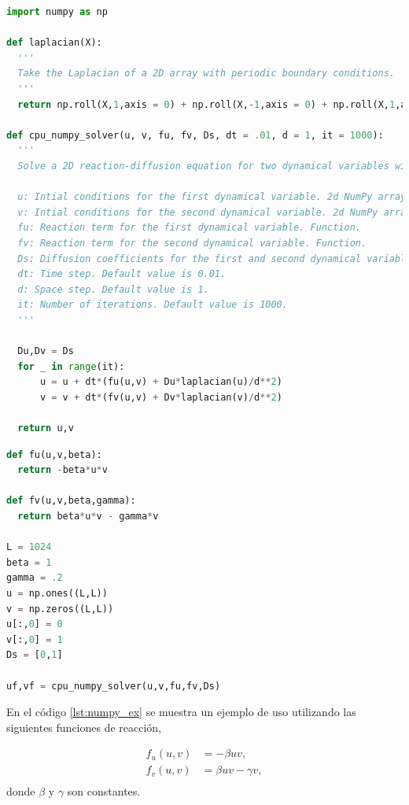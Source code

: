 \begin{lstlisting}[language=Python,caption = Implementación con NumPy.,label = {lst:NumPy}]
import numpy as np

def laplacian(X):
  '''
  Take the Laplacian of a 2D array with periodic boundary conditions.
  '''
  return np.roll(X,1,axis = 0) + np.roll(X,-1,axis = 0) + np.roll(X,1,axis = 1) + np.roll(X,-1,axis = 1) - 4*X

def cpu_numpy_solver(u, v, fu, fv, Ds, dt = .01, d = 1, it = 1000):
  '''
  Solve a 2D reaction-diffusion equation for two dynamical variables with periodic boundary conditions using NumPy.

  u: Intial conditions for the first dynamical variable. 2d NumPy array.
  v: Intial conditions for the second dynamical variable. 2d NumPy array.
  fu: Reaction term for the first dynamical variable. Function.
  fv: Reaction term for the second dynamical variable. Function.
  Ds: Diffusion coefficients for the first and second dynamical variables. List or array of length 2.
  dt: Time step. Default value is 0.01.
  d: Space step. Default value is 1.
  it: Number of iterations. Default value is 1000.
  '''
  
  Du,Dv = Ds
  for _ in range(it):
      u = u + dt*(fu(u,v) + Du*laplacian(u)/d**2)
      v = v + dt*(fv(u,v) + Dv*laplacian(v)/d**2)

  return u,v

\end{lstlisting}


\begin{lstlisting}[language=Python, caption = Ejemplo de uso de la implementación con \textit{NumPy}.,label = {lst:numpy_ex}]
def fu(u,v,beta):
  return -beta*u*v

def fv(u,v,beta,gamma):
  return beta*u*v - gamma*v

L = 1024
beta = 1
gamma = .2
u = np.ones((L,L))
v = np.zeros((L,L))
u[:,0] = 0
v[:,0] = 1
Ds = [0,1]

uf,vf = cpu_numpy_solver(u,v,fu,fv,Ds)
\end{lstlisting}
En el código \ref{lst:numpy_ex} se muestra un ejemplo de uso utilizando las siguientes funciones de reacción,

\begin{equation}
  \begin{split}
    f_u(u,v) &= -\beta u v,\\
    f_v(u,v) &= \beta uv - \gamma v,\\
  \end{split}
\end{equation}
donde $\beta$ y $\gamma$ son constantes.

